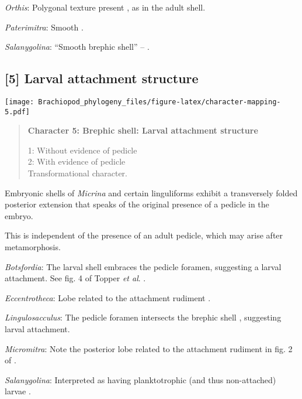 \documentclass[openany]{book}
\theoremstyle{definition}
\theoremstyle{definition}
\theoremstyle{definition}
\theoremstyle{remark}
\begin{document}
\hypertarget{Orthis-coding-4}{}
\emph{Orthis}: Polygonal texture present \citep{Holmer2011Firstrecord},
as in the adult shell.

\hypertarget{Paterimitra-coding-4}{}
\emph{Paterimitra}: Smooth \citep{Holmer2009Theenigmatic}.

\hypertarget{Salanygolina-coding-4}{}
\emph{Salanygolina}: ``Smooth brephic shell'' --
\citet{Popov2009Earlyontogeny}.

\subsection*{{[}5{]} Larval attachment
structure}\label{larval-attachment-structure}

\texttt{[image: Brachiopod\_phylogeny\_files/figure-latex/character-mapping-5.pdf]}

\begin{quote}
\textbf{Character 5: Brephic shell: Larval attachment structure}

1: Without evidence of pedicle\\
2: With evidence of pedicle\\
Transformational character.
\end{quote}

Embryonic shells of \emph{Micrina} and certain linguliforms exhibit a
transversely folded posterior extension that speaks of the original
presence of a pedicle in the embryo.

This is independent of the presence of an adult pedicle, which may arise
after metamorphosis.

\hypertarget{Botsfordia-coding-5}{}
\emph{Botsfordia}: The larval shell embraces the pedicle foramen,
suggesting a larval attachment. See fig. 4 of Topper \emph{et al}.
\citeyearpar{Topper2013Reappraisalof}.

\hypertarget{Eccentrotheca-coding-5}{}
\emph{Eccentrotheca}: Lobe related to the attachment rudiment
\citep[fig. 2]{Balthasar2009Thebrachiopod}.

\hypertarget{Lingulosacculus-coding-5}{}
\emph{Lingulosacculus}: The pedicle foramen intersects the brephic shell
\citep{Holmer1997EarlyCambrian, Li2004}, suggesting larval attachment.

\hypertarget{Micromitra-coding-5}{}
\emph{Micromitra}: Note the posterior lobe related to the attachment
rudiment in fig. 2 of \citet{Balthasar2009Thebrachiopod}.

\hypertarget{Salanygolina-coding-5}{}
\emph{Salanygolina}: Interpreted as having planktotrophic (and thus
non-attached) larvae \citep{Popov2009Earlyontogeny}.
\end{document}

